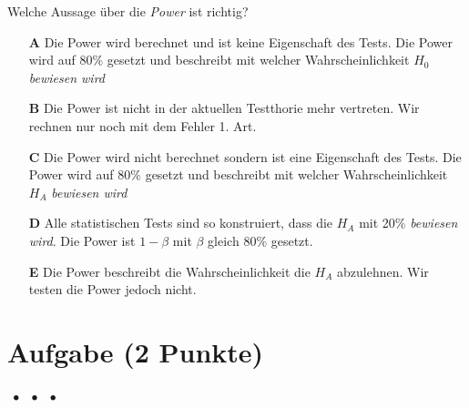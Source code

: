 \documentclass[a4paper, 9pt]{scrartcl}\usepackage[]{graphicx}\usepackage[]{xcolor}
\begin{document}
\ifcollection
\begin{flushright}
\tiny\vspace{-2Ex}
\textbf{\examinhaltstart}
\exammodulebiostat
\vspace{-1Ex}
\end{flushright}
\fi




Welche Aussage über die \textit{Power} ist richtig?



\begin{enumerate}
\item [\textbf{A} \msquare] Die Power wird berechnet und ist keine Eigenschaft des Tests. Die Power wird auf $80\%$ gesetzt und beschreibt mit welcher Wahrscheinlichkeit $H_0$ \textit{bewiesen wird}
\item [\textbf{B} \msquare] Die Power ist nicht in der aktuellen Testthorie mehr vertreten. Wir rechnen nur noch mit dem Fehler 1. Art.
\item [\textbf{C} \msquare] Die Power wird nicht berechnet sondern ist eine Eigenschaft des Tests. Die Power wird auf $80\%$ gesetzt und beschreibt mit welcher Wahrscheinlichkeit $H_A$ \textit{bewiesen wird}
\item [\textbf{D} \msquare] Alle statistischen Tests sind so konstruiert, dass die $H_A$ mit 20\% \textit{bewiesen wird}. Die Power ist $1-\beta$ mit $\beta$ gleich 80\% gesetzt.
\item [\textbf{E} \msquare] Die Power beschreibt die Wahrscheinlichkeit die $H_A$ abzulehnen. Wir testen die Power jedoch nicht.
\end{enumerate} 

\section{Aufgabe \hfill (2 Punkte)}

\ifcollection
\begin{flushright}
\tiny\vspace{-2Ex}
\textbf{\examinhaltstart}
\exammodulestat $\;\bullet$
\exammodulestatbbv $\;\bullet$
\exammodulestatversuch $\;\bullet$
\exammodulebiostat
\vspace{-1Ex}
\end{flushright}
\fi
\end{document}
